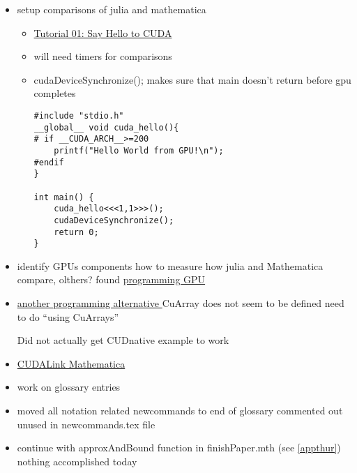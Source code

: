 \documentclass[hyperref,idxtotoc]{labbook}
\begin{document}
\begin{itemize}
\item setup comparisons of julia and mathematica
  \begin{itemize}
  \item \href{https://cuda-tutorial.readthedocs.io/en/latest/tutorials/tutorial01/}{Tutorial 01: Say Hello to CUDA}

  \item will need timers for comparisons

    
\item    cudaDeviceSynchronize(); makes sure that main doesn't return before gpu completes


    
\begin{verbatim}
#include "stdio.h"
__global__ void cuda_hello(){
# if __CUDA_ARCH__>=200
    printf("Hello World from GPU!\n");
#endif  
}

int main() {
    cuda_hello<<<1,1>>>();
    cudaDeviceSynchronize();
    return 0;
}

\end{verbatim}
  \end{itemize}

\item identify GPUs components how to measure how julia and Mathematica compare, olthers?
found \href{https://nextjournal.com/sdanisch/julia-gpu-programming#writing-gpu-kernels}{programming GPU}
\item \href{https://juliagpu.github.io/CUDAnative.jl/stable/man/usage.html}{another programming alternative }
  CuArray does not seem to be defined need to do ``using CuArrays''

  Did not actually get CUDnative example to work
\item \href{https://reference.wolfram.com/cloudplatform/CUDALink/tutorial/Overview.html}{CUDALink Mathematica}
\end{itemize}


\begin{itemize}
\item work on glossary entries
  
\item moved all notation related newcommands to end of glossary commented out unused in newcommands.tex file
\end{itemize}

\begin{itemize}
\item continue with approxAndBound function in finishPaper.mth  (see \ref{appthur})  nothing accomplished today
\end{itemize}
\end{document}
